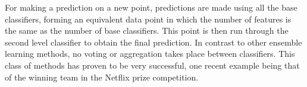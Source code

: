 For making a prediction on a new point, predictions are made using all the base classifiers, forming an equivalent data point in which the number of features is the same as the number of base classifiers. This point is then run through the second level classifier to obtain the final prediction. In contrast to other ensemble learning methods, no voting or aggregation takes place between classifiers. This class of methods has proven to be very successful, one recent example being that of the winning team in the Netflix prize competition.
